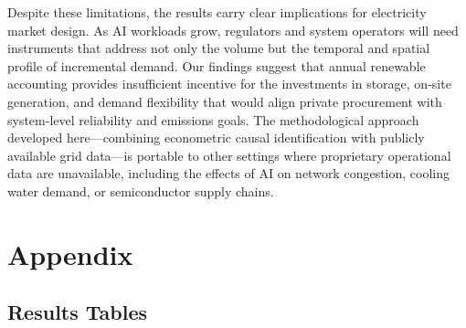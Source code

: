 \documentclass[a4paper,fleqn,longmktitle]{cas-sc}
\begin{document}
Despite these limitations, the results carry clear implications for electricity market design. As AI workloads grow, regulators and system operators will need instruments that address not only the volume but the temporal and spatial profile of incremental demand. Our findings suggest that annual renewable accounting provides insufficient incentive for the investments in storage, on-site generation, and demand flexibility that would align private procurement with system-level reliability and emissions goals. The methodological approach developed here---combining econometric causal identification with publicly available grid data---is portable to other settings where proprietary operational data are unavailable, including the effects of AI on network congestion, cooling water demand, or semiconductor supply chains.




\appendix
\section{Appendix}
\subsection{Results Tables}
\end{document}
